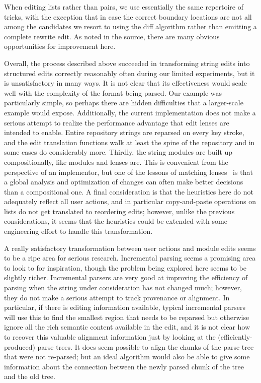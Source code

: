 When editing lists rather than pairs, we use essentially the same repertoire
of tricks, with the exception that in case the correct boundary locations
are not all among the candidates we resort to using the diff algorithm
rather than emitting a complete rewrite edit. As noted in the source, there
are many obvious opportunities for improvement here.

Overall, the process described above succeeded in transforming string edits
into structured edits correctly reasonably often during our limited
experiments, but it is unsatisfactory in many ways. It is not clear that its
effectiveness would scale well with the complexity of the format being
parsed. Our example was particularly simple, so perhaps there are hidden
difficulties that a larger-scale example would expose. Additionally, the
current implementation does not make a serious attempt to realize the
performance advantage that edit lenses are intended to enable. Entire
repository strings are reparsed on every key stroke, and the edit
translation functions walk at least the spine of the repository and in some
cases do considerably more. Thirdly, the string modules are built up
compositionally, like modules and lenses are. This is convenient from the
perspective of an implementor, but one of the lessons of matching
lenses~\cite{Matching10} is that a global analysis and optimization of
changes can often make better decisions than a compositional one. A final
consideration is that the heuristics here do not adequately reflect all user
actions, and in particular copy-and-paste operations on lists do not get
translated to reordering edits; however, unlike the previous considerations,
it seems that the heuristics could be extended with some engineering effort
to handle this transformation.

A really satisfactory transformation between
user actions and module edits seems to be a ripe area for serious research.
Incremental parsing seems a promising area to look to for inspiration,
though the problem being explored here seems to be slightly richer.
Incremental parsers are very good at improving the efficiency of parsing
when the string under consideration has not changed much; however, they do
not make a serious attempt to track provenance or alignment. In particular,
if there is editing information available, typical incremental parsers will
use this to find the smallest region that needs to be reparsed but otherwise
ignore all the rich semantic content available in the edit, and it is not
clear how to recover this valuable alignment information just by looking at
the (efficiently-produced) parse trees. It does seem possible to align the
chunks of the parse tree that were not re-parsed; but an ideal algorithm
would also be able to give some information about the connection between the
newly parsed chunk of the tree and the old tree.

